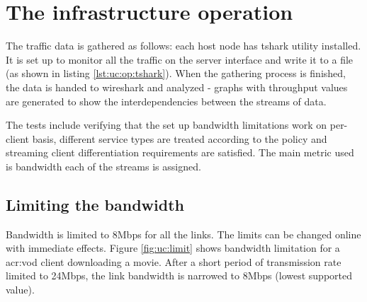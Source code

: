 \documentclass[11pt]{book}
\begin{document}
        \noindent
        \begin{minipage}{\textwidth}
          
        \end{minipage}


    \section{The infrastructure operation}
    \label{sec:uc:operation}

      The traffic data is gathered as follows: each host node has tshark utility installed. It is set up to monitor all
      the traffic on the server interface and write it to a file (as shown in listing \ref{lst:uc:op:tshark}). When the
      gathering process is finished, the data is handed to wireshark and analyzed - graphs with throughput values are
      generated to show the interdependencies between the streams of data. \\

      \noindent
      \begin{minipage}{\textwidth}
        
      \end{minipage}

      The tests include verifying that the set up bandwidth limitations work on per-client basis, different service
      types are treated according to the policy and streaming client differentiation requirements are satisfied. The
      main metric used is bandwidth each of the streams is assigned.


      \subsection{Limiting the bandwidth}
      \label{sub:uc:limit}

        Bandwidth is limited to 8Mbps for all the links. The limits can be changed online with immediate effects. Figure
        \ref{fig:uc:limit} shows bandwidth limitation for a \gls{acr:vod} client downloading a movie. After a short
        period of transmission rate limited to 24Mbps, the link bandwidth is narrowed to 8Mbps (lowest supported value).
\end{document}
